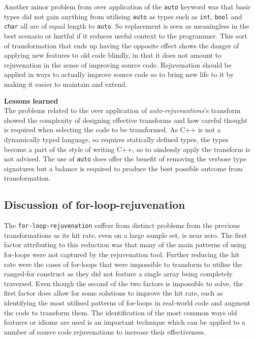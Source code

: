 \documentclass[bsc,frontabs,singlespacing,twoside,parskip,deptreport]{infthesis}
\begin{document}
Another minor problem from over application of the \texttt{auto} keyword was that basic types did not gain anything from utilising \texttt{auto} as types such as \texttt{int}, \texttt{bool} and \texttt{char} all are of equal length to \texttt{auto}. So replacement is seen as meaningless in the best scenario or hurtful if it reduces useful context to the programmer. This sort of transformation that ends up having the opposite effect shows the danger of applying new features to old code blindly, in that it does not amount to rejuvenation in the sense of improving source code. Rejuvenation should be applied in ways to actually improve source code so to bring new life to it by making it easier to maintain and extend. 

\textbf{Lessons learned}\\
The problems related to the over application of \textit{auto-rejuveantions}'s transform showed the complexity of designing effective transforms and how careful thought is required when selecting the code to be transformed. As C++ is not a dynamically typed language, so requires statically defined types, the types become a part of the style of writing C++, so to aimlessly apply the transform is not advised. The use of \texttt{auto} does offer the benefit of removing the verbose type signatures but a balance is required to produce the best possible outcome from transformation. 

\subsection{Discussion of for-loop-rejuvenation}

The \texttt{for-loop-rejuvenation} suffers from distinct problems from the previous transformations as its hit rate, even on a large sample set, is near zero. The first factor attributing to this reduction was that many of the main patterns of using for-loops were not captured by the rejuvenation tool. Further reducing the hit rate were the cases of for-loops that were impossible to transform to utilise the ranged-for construct as they did not feature a single array being completely traversed. Even though the second of the two factors is impossible to solve, the first factor does allow for some solutions to improve the hit rate, such as identifying the most utilised patterns of for-loops in real-world code and augment the code to transform them. The identification of the most common ways old features or idioms are used is an important technique which can be applied to a number of source code rejuvenations to increase their effectiveness.
\end{document}
